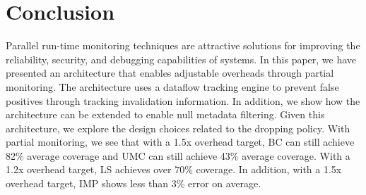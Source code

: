 \section{Conclusion}
\label{sec:conclusion}

Parallel run-time monitoring techniques are attractive solutions for improving
the reliability, security, and debugging capabilities of systems. In this
paper, we have presented an architecture that enables adjustable overheads through partial monitoring. 
The architecture uses a dataflow tracking engine to prevent false positives
through tracking invalidation information. In addition, we show how the
architecture can be extended to enable null metadata filtering.
Given this architecture, we explore the design choices related to the dropping policy.
With partial monitoring, we see that with a 1.5x overhead target, BC can still
achieve 82\% average coverage and UMC can still achieve 43\% average coverage.
With a 1.2x overhead target, LS achieves over 70\% coverage.
In addition, with a 1.5x overhead target, IMP shows less than 3\% error on
average.

